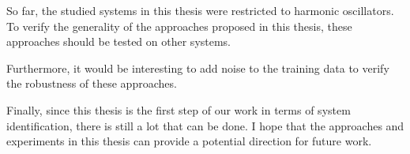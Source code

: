 \documentclass[
	parskip, 			   %
	twoside, 			   %
	DIV=14, 			   %
	BCOR=15.0mm, 		   %
	headsepline, 		   %
	open=right, 		   %
	captions=tableheading, %
	bibliography=totoc,    %
	numbers=noenddot       %
]{scrreprt}
\begin{document}
So far, the studied systems in this thesis were restricted to harmonic oscillators. To verify the generality of the approaches proposed in this thesis, these approaches should be tested on other systems. 

Furthermore, it would be interesting to add noise to the training data to verify the robustness of these approaches.

Finally, since this thesis is the first step of our work in terms of system identification, there is still a lot that can be done. I hope that the approaches and experiments in this thesis can provide a potential direction for future work.


\renewcommand{\bibname}{References} %



\appendix
\end{document}
